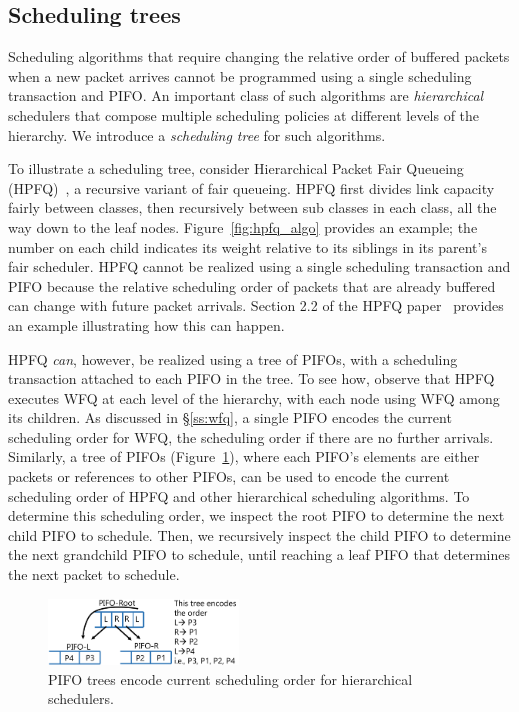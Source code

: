 \subsection{Scheduling trees}
\label{ss:hpfq}

Scheduling algorithms that require changing the relative order of buffered
packets when a new packet arrives cannot be programmed using a single
scheduling transaction and PIFO. An important class of such algorithms are {\em
hierarchical} schedulers that compose multiple scheduling policies at different
levels of the hierarchy. We introduce a {\em scheduling tree} for such
algorithms.

To illustrate a scheduling tree, consider Hierarchical Packet Fair Queueing
(HPFQ)~\cite{hpfq}, a recursive variant of fair queueing. HPFQ first divides
link capacity fairly between classes, then recursively between sub classes in
each class, all the way down to the leaf nodes.  Figure~\ref{fig:hpfq_algo}
provides an example; the number on each child indicates its weight relative to
its siblings in its parent's fair scheduler.  HPFQ cannot be realized using a
single scheduling transaction and PIFO because the relative scheduling order of
packets that are already buffered can change with future packet arrivals.
Section 2.2 of the HPFQ paper~\cite{hpfq} provides an example illustrating how
this can happen.

HPFQ {\em can}, however, be realized using a tree of PIFOs, with a scheduling
transaction attached to each PIFO in the tree. To see how, observe that HPFQ
executes WFQ at each level of the hierarchy, with each node using WFQ among its
children. As discussed in \S\ref{ss:wfq}, a single PIFO encodes the current
scheduling order for WFQ, \ie the scheduling order if there are no further
arrivals. Similarly, a tree of PIFOs (Figure~\ref{fig:pifo_encoding}), where
each PIFO's elements are either packets or references to other PIFOs, can be
used to encode the current scheduling order of HPFQ and other hierarchical
scheduling algorithms. To determine this scheduling order, we inspect the root
PIFO to determine the next child PIFO to schedule. Then, we recursively inspect
the child PIFO to determine the next grandchild PIFO to schedule, until
reaching a leaf PIFO that determines the next packet to schedule.

\begin{figure}
\centering
\includegraphics[width=0.45\textwidth]{pifo_pifo_tree_encoding.pdf}
\caption{PIFO trees encode current scheduling order for hierarchical schedulers.}
\label{fig:pifo_encoding}
\end{figure}

